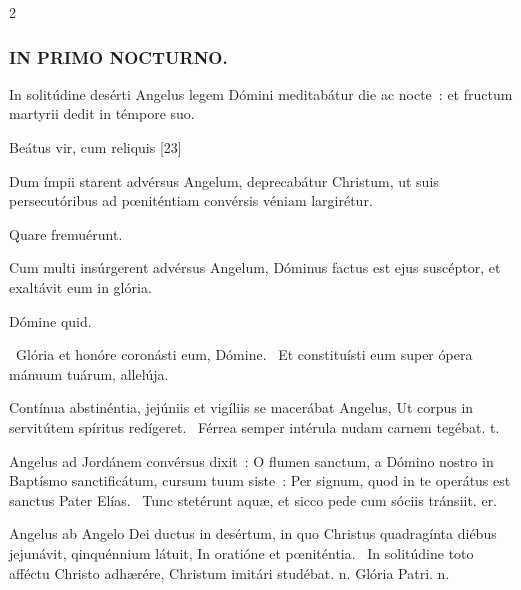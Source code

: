 \documentclass[9pt,twoside]{extarticle}
\begin{document}
\begin{multicols}{2}
\subsubsection*{\center \textsc{IN PRIMO NOCTURNO.}}
\begin{tightlist}{}
\item {} In solitúdine desérti Angelus legem Dómini meditabátur die ac nocte~: et fructum martyrii dedit in témpore suo.
\item {} Beátus vir, cum reliquis  [23]
\item {} Dum ímpii starent advérsus Angelum, deprecabátur Christum, ut suis persecutóribus ad pœniténtiam convérsis véniam largirétur.
\item {} Quare fremuérunt.
\item {} Cum multi insúrgerent advérsus Angelum, Dóminus factus est ejus suscéptor, et exaltávit eum in glória.
\item {} Dómine quid.
\item {}~Glória et honóre coronásti eum, Dómine. ~Et constituísti eum super ópera mánuum tuárum, allelúja.
\item {}
\item {} Contínua abstinéntia, jejúniis et vigíliis se macerábat Angelus, \textred{*} Ut corpus in servitútem spíritus redígeret. ~Férrea semper intérula nudam carnem tegébat. t.
\item {} Angelus ad Jordánem convérsus dixit~: O flumen sanctum, a Dómino nostro in Baptísmo sanctificátum, cursum tuum siste~: \textred{*} Per signum, quod in te operátus est sanctus Pater Elías. ~Tunc stetérunt aquæ, et sicco pede cum sóciis tránsiit. er.
\item {} Angelus ab Angelo Dei ductus in desértum, in quo Christus quadragínta diébus jejunávit, qinquénnium látuit, \textred{*} In oratióne et pœniténtia. ~In solitúdine toto afféctu Christo adhærére, Christum imitári studébat. n. Glória Patri. n.
\end{tightlist}


\end{multicols}
\end{document}
